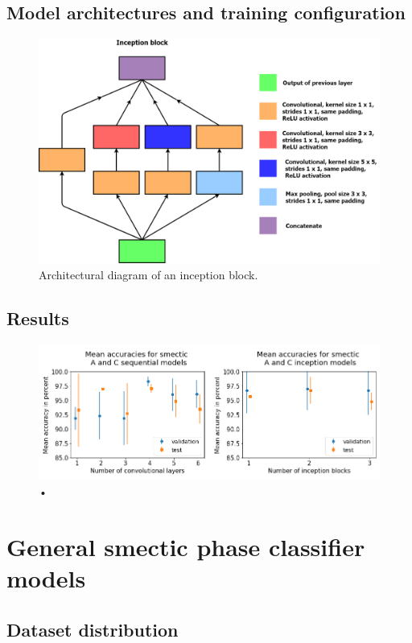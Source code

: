 \documentclass[12pt]{article}
\begin{document}
\subsection{Model architectures and training configuration}
\begin{figure}[h]
\centering
\includegraphics[width=6.6in]{images/inception_block.png}
\caption{Architectural diagram of an inception block.}
\end{figure}

\subsection{Results}
\begin{figure}[h]
	\centering
    \includegraphics[width=5.6678in]{images/smecticAC_graphs.png}
    \caption{•}
\end{figure} 
\section{General smectic phase classifier models}
\subsection{Dataset distribution}
\end{document}
